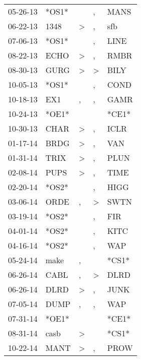 \begin{supertabular}{lllll}
 05-26-13 &  *OS1* &                  &                , &   MANS \\
 06-22-13 &   1348 &     \textgreater &                , &    sfb \\
 07-06-13 &  *OS1* &                  &                , &   LINE \\
 08-22-13 &   ECHO &     \textgreater &                , &   RMBR \\
 08-30-13 &   GURG &     \textgreater &     \textgreater &   BILY \\
 10-05-13 &  *OS1* &                  &                , &   COND \\
 10-18-13 &    EX1 &                , &                , &   GAMR \\
 10-24-13 &  *OE1* &                  &                  &  *CE1* \\
 10-30-13 &   CHAR &     \textgreater &                , &   ICLR \\
 01-17-14 &   BRDG &     \textgreater &                , &    VAN \\
 01-31-14 &   TRIX &     \textgreater &                , &   PLUN \\
 02-08-14 &   PUPS &     \textgreater &                , &   TIME \\
 02-20-14 &  *OS2* &                  &                , &   HIGG \\
 03-06-14 &   ORDE &                , &     \textgreater &   SWTN \\
 03-19-14 &  *OS2* &                  &                , &    FIR \\
 04-01-14 &  *OS2* &                  &                , &   KITC \\
 04-16-14 &  *OS2* &                  &                , &    WAP \\
 05-24-14 &   make &                , &                  &  *CS1* \\
 06-26-14 &   CABL &                , &     \textgreater &   DLRD \\
 06-26-14 &   DLRD &     \textgreater &                , &   JUNK \\
 07-05-14 &   DUMP &                , &                , &    WAP \\
 07-31-14 &  *OE1* &                  &                  &  *CE1* \\
 08-31-14 &   casb &     \textgreater &                  &  *CS1* \\
 10-22-14 &   MANT &     \textgreater &                , &   PROW \\

\end{supertabular}
